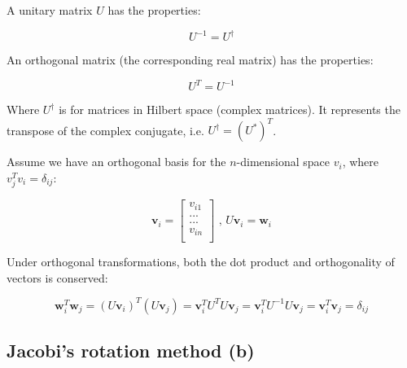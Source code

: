 \documentclass[11pt]{article}
\begin{document}
\begin{flushleft}
A unitary matrix $U$ has the properties: 

\begin{equation}
U^{-1} = U^{\dagger}
\end{equation}

An orthogonal matrix (the corresponding real matrix) has the properties:

\begin{equation}
U^T = U^{-1}
\end{equation}

Where $U^{\dagger}$ is for matrices in Hilbert space (complex matrices). It represents the transpose of the complex conjugate, i.e. $U^{\dagger} = (U^*)^T$.
\end{flushleft}

\begin{flushleft}
Assume we have an orthogonal basis for the $n$-dimensional space $v_i$, where $v_j^T v_i = \delta_{ij}$:

\begin{equation*}
\textbf{v}_i = \begin{bmatrix}
v_{i1}\\
...\\
...\\
v_{in}\\
\end{bmatrix}
\text{ , }
U \textbf{v}_i = \textbf{w}_i
\end{equation*} 

Under orthogonal transformations, both the dot product and orthogonality of vectors is conserved:

$$
\textbf{w}_i^T \textbf{w}_j = (U \textbf{v}_i)^T (U \textbf{v}_j) = \textbf{v}_i^T U^T U \textbf{v}_j = \textbf{v}_i^T U^{-1} U \textbf{v}_j = \textbf{v}_i^T \textbf{v}_j = \delta_{ij}
$$
\end{flushleft}

\subsection*{Jacobi's rotation method (b)}
\end{document}
